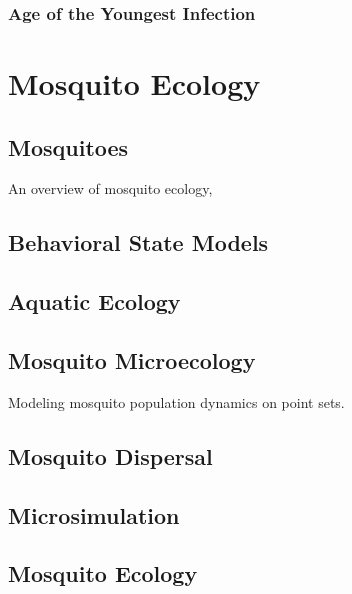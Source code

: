 \documentclass[
]{book}
\begin{document}
\hypertarget{age-of-the-youngest-infection}{%
\section{Age of the Youngest Infection}\label{age-of-the-youngest-infection}}

\hypertarget{part-mosquito-ecology}{%
\part{Mosquito Ecology}\label{part-mosquito-ecology}}

\hypertarget{mosquitoes}{%
\chapter{Mosquitoes}\label{mosquitoes}}

An overview of mosquito ecology,

\hypertarget{behavioral-state-models}{%
\chapter{Behavioral State Models}\label{behavioral-state-models}}

\hypertarget{aquatic-ecology}{%
\chapter{Aquatic Ecology}\label{aquatic-ecology}}

\hypertarget{mosquito-microecology}{%
\chapter{Mosquito Microecology}\label{mosquito-microecology}}

Modeling mosquito population dynamics on point sets.

\hypertarget{mosquito-dispersal}{%
\chapter{Mosquito Dispersal}\label{mosquito-dispersal}}

\hypertarget{microsimulation}{%
\chapter{Microsimulation}\label{microsimulation}}

\hypertarget{mosquito-ecology-2}{%
\chapter{Mosquito Ecology}\label{mosquito-ecology-2}}
\end{document}
